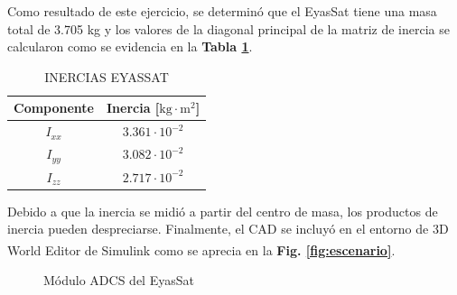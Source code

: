 Como resultado de este ejercicio, se determinó que el EyasSat tiene una masa total de 3.705 kg y los valores de la diagonal principal de la matriz de inercia se calcularon como se evidencia en la \textbf{Tabla \ref{table:inercia_eyassat}}.
\begin{table}[h]
	\caption{\MakeUppercase{Inercias EyasSat}}
	\begin{center}
		\begin{tabular}{ c c}
			
			Componente & Inercia [$\mathrm{kg}\cdot \mathrm{m}^2$] \\ \hline
			$I_{xx}$ &  $3.361\cdot10^{-2}$ \\ 
			$I_{yy}$ &  $3.082\cdot10^{-2}$ \\ 
			$I_{zz}$ &  $2.717\cdot10^{-2}$ \\ \hline
	
		\end{tabular}
	\end{center}
	\label{table:inercia_eyassat}
\end{table}

Debido a que la inercia se midió a partir del centro de masa, los productos de inercia pueden despreciarse. Finalmente, el CAD se incluyó en el entorno de 3D World Editor de Simulink\textsuperscript{\tiny\textregistered} como se aprecia en la \textbf{Fig. \ref{fig:escenario}}.


\begin{figure}[h!]
	\centering
	
	\caption{Módulo ADCS del EyasSat}
	\label{fig:mediciones}
\end{figure}



